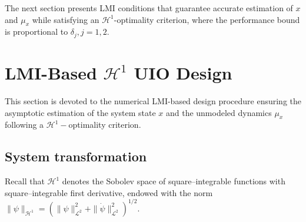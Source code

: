 \documentclass{ifacconf}
\begin{document}
The next section presents LMI conditions that guarantee accurate estimation of $x$ and $\mu_{x}$ while satisfying an $\mathcal{H}^{1}$-optimality criterion, where the performance bound is proportional to $\delta_{j}, j=1,2$.








\section{LMI-Based $\mathcal{H}^{1}$ UIO Design}\label{uio}
This section is devoted to the numerical LMI-based design procedure ensuring the asymptotic estimation of the system state $x$ and the unmodeled dynamics $\mu_{x}$ following a $\mathcal{H}^{1}-$optimality criterion.

\subsection{System transformation}
Recall that $\mathcal{H}^{1}$ denotes the Sobolev space of square--integrable functions with square--integrable first derivative, endowed with the norm
$\|\psi\|_{\mathcal{H}^{1}}=(\|\psi\|_{\mathcal{L}^{2}}^2+\|\dot{\psi}\|_{\mathcal{L}^{2}}^2)^{1/2}$.
\end{document}
